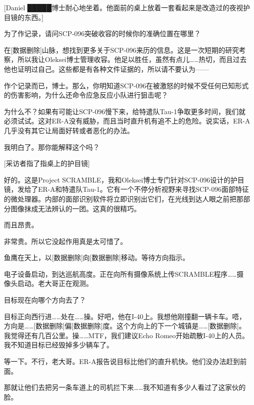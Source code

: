 \begin{scpbox}



{[}Daniel █████博士耐心地坐着。他面前的桌上放着一套看起来是改造过的夜视护目镜的东西。]

为了作记录，请问SCP-096突破收容的时候你的准确位置在哪里？

在{[}数据删除]山脉，想找到更多关于SCP-096来历的信息。这是一次短期的研究考察，所以我让Oleksei博士管理收容。他足以胜任，虽然有点儿……热切，而且过去他也证明过自己。这些都是有各种文件证据的，所以请不要认为——

作个记录而已，博士。那么，你明知道SCP-096在被激怒的时候不受任何已知形式的伤害影响，为什么还命令应急反应小队进行狙击呢？

为什么不？如果有可能让SCP-096慢下来，给特遣队Tau-1争取更多时间，我们就必须试试。这对ER-A没有威胁，而且当时直升机有追不上的危险。说实话，ER-A几乎没有其它让局面好转或者恶化的办法。

我明白了。那你能解释这个吗？

{[}采访者指了指桌上的护目镜]

好的。这是Project SCRAMBLE，我和Oleksei博士专门针对SCP-096设计的护目镜，发给了ER-A和特遣队Tau-1。它有一个不停分析视野来寻找SCP-096面部特征的微处理器。内部的面部识别软件将立即识别出它们，在光线到达人眼之前把那部分图像抹成无法辨认的一团。这真的很精巧。

而且昂贵。

非常贵。所以它没起作用真是太可惜了。


\end{scpbox}

\begin{scpbox}



鱼鹰在天上，以{[}数据删除]向{[}数据删除]移动。等待方向指示。

电子设备启动，到达巡航高度。正在向所有摄像系统上传SCRAMBLE程序……摄像头启动。老大哥正在观测。

目标现在向哪个方向去了？

目标正向西行进……处在……操。好吧，他在I-40上。我想他刚撞翻一辆卡车。唔，方向是……{[}数据删除]偏{[}数据删除]度。这个方向上的下一个城镇是……{[}数据删除]。我觉得还有几百公里。操……MTF，我们建议Echo Romeo开始疏散I-40上的人员。我不知道目标已经毁掉多少辆车了。

等一下。不行，老大哥。ER-A报告说目标比他们的直升机快。他们没办法赶到前面。

那就让他们去把另一条车道上的司机拦下来……我不知道有多少人看过了这家伙的脸。


\end{scpbox}

